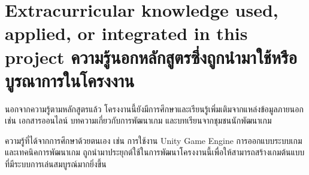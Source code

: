 \section{\ifenglish%
Extracurricular knowledge used, applied, or integrated in this project
\else%
ความรู้นอกหลักสูตรซึ่งถูกนำมาใช้หรือบูรณาการในโครงงาน
\fi
}

นอกจากความรู้ตามหลักสูตรแล้ว โครงงานนี้ยังมีการศึกษาและเรียนรู้เพิ่มเติมจากแหล่งข้อมูลภายนอก เช่น เอกสารออนไลน์ บทความเกี่ยวกับการพัฒนาเกม และบทเรียนจากชุมชนนักพัฒนาเกม

ความรู้ที่ได้จากการศึกษาด้วยตนเอง เช่น การใช้งาน Unity Game Engine การออกแบบระบบเกม และเทคนิคการพัฒนาเกม ถูกนำมาประยุกต์ใช้ในการพัฒนาโครงงานนี้เพื่อให้สามารถสร้างเกมต้นแบบที่มีระบบการเล่นสมบูรณ์มากยิ่งขึ้น